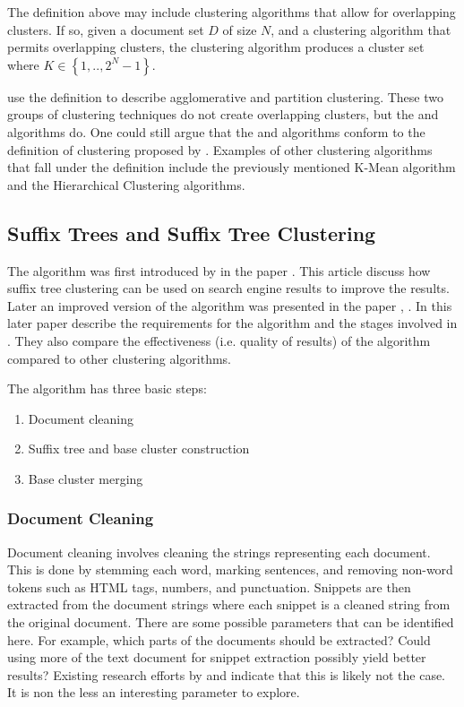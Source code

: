 The definition above may include clustering algorithms that allow for overlapping clusters. If so, given a document set \(D\) of size \(N\), and a clustering algorithm that permits overlapping clusters, the clustering algorithm produces a cluster set where \(K \in \left\{1, .., 2^{N}-1\right\}\).

 \citeauthor{Baeza-Yates2011a} use the definition to describe agglomerative and partition clustering. These two groups of clustering techniques do not create overlapping clusters, but the \STC and \CTC algorithms do. One could still argue that the \STC and \CTC algorithms conform to the definition of clustering proposed by \citeauthor{Baeza-Yates2011a}. Examples of other clustering algorithms that fall under the definition include the previously mentioned K-Mean algorithm and the Hierarchical Clustering algorithms.

\subsection{Suffix Trees and Suffix Tree Clustering}
The \STC algorithm was first introduced by \textcite{Oren1997} in the paper . This article discuss how suffix tree clustering can be used on search engine results to improve the results. Later an improved version of the algorithm was presented in the paper , \parencite{Oren1998}. In this later paper \citeauthor{Oren1998} describe the requirements for the \STC algorithm and the stages involved in \STC. They also compare the effectiveness (i.e. quality of results) of the algorithm compared to other clustering algorithms.

The \STC algorithm has three basic steps:
\begin{enumerate}
\item Document cleaning
\item Suffix tree and base cluster construction
\item Base cluster merging
\end{enumerate}

\subsubsection{Document Cleaning}

Document cleaning involves cleaning the strings representing each document. This is done by stemming each word, marking sentences, and removing non-word tokens such as HTML tags, numbers, and punctuation. Snippets are then extracted from the document strings where each snippet is a cleaned string from the original document. There are some possible parameters that can be identified here. For example, which parts of the documents should be extracted? Could using more of the text document for snippet extraction possibly yield better results? Existing research efforts by \cite{Oren1998} and \cite{Moe2013compact} indicate that this is likely not the case. It is non the less an interesting parameter to explore.

